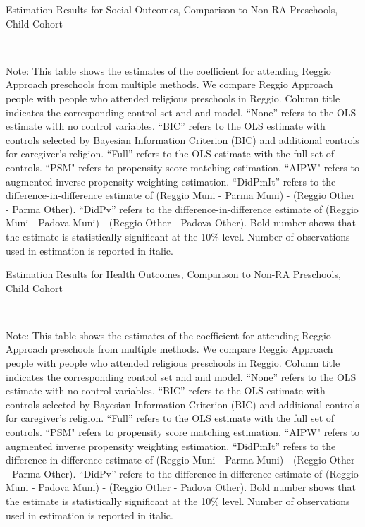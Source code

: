 \begin{table}[H] \caption{Estimation Results for Social Outcomes, Comparison to Non-RA Preschools, Child Cohort} \label{ols-S-child-reg-reli}
\scalebox{0.8}{}
\vspace{1ex} \\
\footnotesize\raggedright{Note: This table shows the estimates of the coefficient for attending Reggio Approach preschools from multiple methods. We compare Reggio Approach people with people who attended religious preschools in Reggio. Column title indicates the corresponding control set and and model. ``None'' refers to the OLS estimate with no control variables. ``BIC'' refers to the OLS estimate with controls selected by Bayesian Information Criterion (BIC) and additional controls for caregiver's religion. ``Full'' refers to the OLS estimate with the full set of controls. ``PSM" refers to propensity score matching estimation. ``AIPW" refers to augmented inverse propensity weighting estimation. ``DidPmIt'' refers to the difference-in-difference estimate of (Reggio Muni - Parma Muni) - (Reggio Other - Parma Other). ``DidPv'' refers to the difference-in-difference estimate of (Reggio Muni - Padova Muni) - (Reggio Other - Padova Other). Bold number shows that the estimate is statistically significant at the 10\% level. Number of observations used in estimation is reported in italic.}
\end{table}


\begin{table}[H] \caption{Estimation Results for Health Outcomes, Comparison to Non-RA Preschools, Child Cohort} \label{ols-H-child-reg-reli}
\scalebox{0.8}{}
\vspace{1ex} \\
\footnotesize\raggedright{Note: This table shows the estimates of the coefficient for attending Reggio Approach preschools from multiple methods. We compare Reggio Approach people with people who attended religious preschools in Reggio. Column title indicates the corresponding control set and and model. ``None'' refers to the OLS estimate with no control variables. ``BIC'' refers to the OLS estimate with controls selected by Bayesian Information Criterion (BIC) and additional controls for caregiver's religion. ``Full'' refers to the OLS estimate with the full set of controls. ``PSM" refers to propensity score matching estimation. ``AIPW" refers to augmented inverse propensity weighting estimation. ``DidPmIt'' refers to the difference-in-difference estimate of (Reggio Muni - Parma Muni) - (Reggio Other - Parma Other). ``DidPv'' refers to the difference-in-difference estimate of (Reggio Muni - Padova Muni) - (Reggio Other - Padova Other). Bold number shows that the estimate is statistically significant at the 10\% level. Number of observations used in estimation is reported in italic.}
\end{table}


